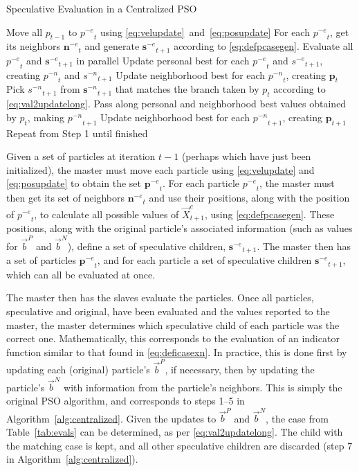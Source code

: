 \documentclass[smallcondensed]{svjour3}
\newcommand{\alg}[1]{Algorithm~\ref{alg:#1}}
\providecommand{\pers}{\ensuremath{P}}
\providecommand{\neigh}{\ensuremath{N}}
\providecommand{\nbest}{\ensuremath{\Vec{b}^\neigh}}
\providecommand{\pbest}{\ensuremath{\Vec{b}^\pers}}
\providecommand{\specpos}{\ensuremath{\Vec{X}}}
\providecommand{\casegen}{\ensuremath{c}}
\providecommand{\noeval}[1]{\ensuremath{#1^{-e}}}
\providecommand{\nonbest}[1]{\ensuremath{#1^{-n}}}
\providecommand{\p}{\ensuremath{p}}
\providecommand{\pset}{\ensuremath{\mathbf{p}}}
\providecommand{\s}{\ensuremath{s}}
\providecommand{\sset}{\ensuremath{\mathbf{s}}}
\providecommand{\nset}{\ensuremath{\mathbf{n}}}
\begin{document}
\begin{algorithm}
  \caption{Speculative Evaluation in a Centralized PSO}
  \label{alg:centralized}
  \begin{algorithmic}[1]
	\STATE Move all $\p_{t-1}$ to $\noeval{\p}_t$ using
	  \eqref{eq:velupdate}~and~\eqref{eq:posupdate}
	\STATE For each $\noeval{\p}_t$, get its neighbors $\noeval{\nset}_t$ and
	  generate $\noeval{\sset}_{t+1}$ according to
	  \eqref{eq:defpcasegen}.
	\STATE Evaluate all $\noeval{\p}_t$ and $\noeval{\sset}_{t+1}$ in parallel
	\STATE Update personal best for each $\noeval{\p}_t$ and
	  $\noeval{\s}_{t+1}$, creating $\nonbest{\p}_t$ and $\nonbest{\s}_{t+1}$
	\STATE Update neighborhood best for each $\nonbest{\p}_t$, creating
	  $\pset_t$
	\FORALL{$\p_t$}
	\STATE Pick $\nonbest{\s}_{t+1}$ from $\nonbest{\sset}_{t+1}$ that matches
	  the branch taken by $\p_t$ according to
	  \eqref{eq:val2updatelong}.
	\STATE Pass along personal and neighborhood best values obtained by $\p_t$,
	  making $\nonbest{\p}_{t+1}$
	\ENDFOR
	\STATE Update neighborhood best for each $\nonbest{\p}_{t+1}$, creating
	  $\pset_{t+1}$
	\STATE Repeat from Step 1 until finished
  \end{algorithmic}
\end{algorithm}

Given a set of particles at iteration $t-1$ (perhaps which have just been
initialized), the master must move each particle using \eqref{eq:velupdate} and
\eqref{eq:posupdate} to obtain the set $\noeval{\pset}_t$.  For each particle
$\noeval{\p}_t$, the master must then get its set of neighbors
$\noeval{\nset}_t$ and use their positions, along with the position of
$\noeval{\p}_t$, to calculate all possible values of
$\specpos_{t+1}^{\casegen}$, using \eqref{eq:defpcasegen}.  These positions,
along with the original particle's associated information (such as values for
$\pbest$ and $\nbest$), define a set of speculative children,
$\noeval{\sset}_{t+1}$.  The master then has a set of particles
$\noeval{\pset}_t$, and for each particle a set of speculative children
$\noeval{\sset}_{t+1}$, which can all be evaluated at once.

The master then has the slaves evaluate the particles.  Once all particles,
speculative and original, have been evaluated and the values reported to the
master, the master determines which speculative child of each particle was the
correct one.  Mathematically, this corresponds to the evaluation of an
indicator function similar to that found in \eqref{eq:deficasexn}.  In
practice, this is done first by updating each (original) particle's $\pbest$,
if necessary, then by updating the particle's $\nbest$ with information from
the particle's neighbors.  This is simply the original PSO algorithm, and
corresponds to steps 1--5 in \alg{centralized}.  Given the updates to $\pbest$
and $\nbest$, the case from Table~\ref{tab:evals} can be determined, as per
\eqref{eq:val2updatelong}.  The child with the matching case is kept, and all
other speculative children are discarded (step 7 in \alg{centralized}).
\end{document}
